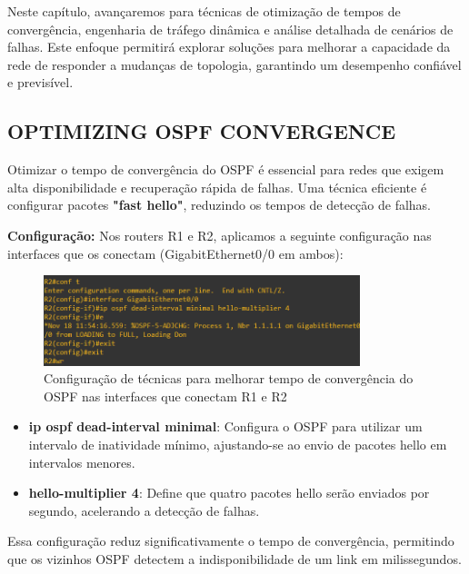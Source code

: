 \documentclass[11pt,english, openright, oneside]{book}
\begin{document}
Neste capítulo, avançaremos para técnicas de otimização de tempos de convergência, engenharia de tráfego dinâmica e análise detalhada de cenários de falhas. Este enfoque permitirá explorar soluções para melhorar a capacidade da rede de responder a mudanças de topologia, garantindo um desempenho confiável e previsível.

\subsection{OPTIMIZING OSPF CONVERGENCE}
\vspace{0.2cm}

Otimizar o tempo de convergência do OSPF é essencial para redes que exigem alta disponibilidade e recuperação rápida de falhas. Uma técnica eficiente é configurar pacotes \textbf{"fast hello"}, reduzindo os tempos de detecção de falhas.
\vspace{0.2cm}

\textbf{Configuração:}
Nos routers R1 e R2, aplicamos a seguinte configuração nas interfaces que os conectam (GigabitEthernet0/0 em ambos):

\begin{figure}[H]
  \centering
  \includegraphics[width=0.82\textwidth]{imagens/Tarefa6/27.ospf_convergence_R2.png}
  \caption{Configuração de técnicas para melhorar tempo de convergência do OSPF nas interfaces que conectam R1 e R2}
  \label{fig:config42}
\end{figure}


\begin{itemize}
  \item \textbf{ip ospf dead-interval minimal}: Configura o OSPF para utilizar um intervalo de inatividade mínimo, ajustando-se ao envio de pacotes hello em intervalos menores.
  \item \textbf{hello-multiplier 4}: Define que quatro pacotes hello serão enviados por segundo, acelerando a detecção de falhas.
\end{itemize}

Essa configuração reduz significativamente o tempo de convergência, permitindo que os vizinhos OSPF detectem a indisponibilidade de um link em milissegundos.
\end{document}
